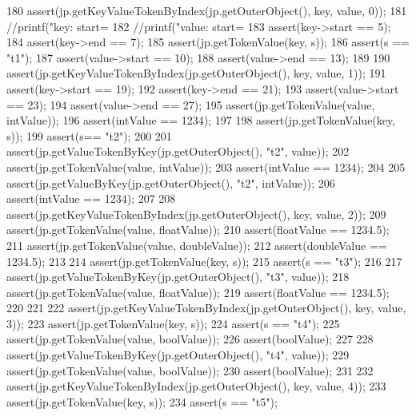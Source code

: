 \begin{DoxyCode}
{180         assert(jp.getKeyValueTokenByIndex(jp.getOuterObject(), key, value, 0));
181         \textcolor{comment}{//printf("key: start=%
182         \textcolor{comment}{//printf("value: start=%
183         assert(key->start == 5);
184         assert(key->end == 7);
185         assert(jp.getTokenValue(key, s));
186         assert(s == \textcolor{stringliteral}{"t1"});
187         assert(value->start == 10);
188         assert(value->end == 13);
189 
190         assert(jp.getKeyValueTokenByIndex(jp.getOuterObject(), key, value, 1));
191         assert(key->start == 19);
192         assert(key->end == 21);
193         assert(value->start == 23);
194         assert(value->end == 27);
195         assert(jp.getTokenValue(value, intValue));
196         assert(intValue == 1234);
197 
198         assert(jp.getTokenValue(key, s));
199         assert(s== \textcolor{stringliteral}{"t2"});
200 
201         assert(jp.getValueTokenByKey(jp.getOuterObject(), \textcolor{stringliteral}{"t2"}, value));
202         assert(jp.getTokenValue(value, intValue));
203         assert(intValue == 1234);
204 
205         assert(jp.getValueByKey(jp.getOuterObject(), \textcolor{stringliteral}{"t2"}, intValue));
206         assert(intValue == 1234);
207 
208         assert(jp.getKeyValueTokenByIndex(jp.getOuterObject(), key, value, 2));
209         assert(jp.getTokenValue(value, floatValue));
210         assert(floatValue == 1234.5);
211         assert(jp.getTokenValue(value, doubleValue));
212         assert(doubleValue == 1234.5);
213 
214         assert(jp.getTokenValue(key, s));
215         assert(s == \textcolor{stringliteral}{"t3"});
216 
217         assert(jp.getValueTokenByKey(jp.getOuterObject(), \textcolor{stringliteral}{"t3"}, value));
218         assert(jp.getTokenValue(value, floatValue));
219         assert(floatValue == 1234.5);
220 
221 
222         assert(jp.getKeyValueTokenByIndex(jp.getOuterObject(), key, value, 3));
223         assert(jp.getTokenValue(key, s));
224         assert(s == \textcolor{stringliteral}{"t4"});
225         assert(jp.getTokenValue(value, boolValue));
226         assert(boolValue);
227 
228         assert(jp.getValueTokenByKey(jp.getOuterObject(), \textcolor{stringliteral}{"t4"}, value));
229         assert(jp.getTokenValue(value, boolValue));
230         assert(boolValue);
231 
232         assert(jp.getKeyValueTokenByIndex(jp.getOuterObject(), key, value, 4));
233         assert(jp.getTokenValue(key, s));
234         assert(s == \textcolor{stringliteral}{"t5"});
}}}
\end{DoxyCode}
